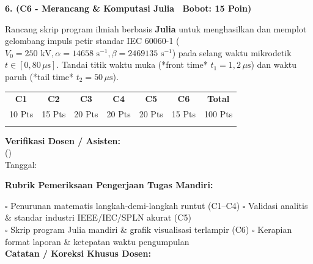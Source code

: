 \documentclass[10pt,a4paper]{article}
\begin{document}
\vspace{3.5mm}

\noindent\textbf{6. (C6 - Merancang \& Komputasi Julia \textbar\ Bobot: 15 Poin)}\par\vspace{0.8mm}
{\footnotesize Rancang skrip program ilmiah berbasis \textbf{Julia} untuk menghasilkan dan memplot gelombang impuls petir standar IEC 60060-1 ($V_0 = 250\text{ kV}, \alpha = 14658\text{ s}^{-1}, \beta = 2469135\text{ s}^{-1}$) pada selang waktu mikrodetik $t \in [0, 80\,\mu\text{s}]$. Tandai titik waktu muka (*front time* $t_1 = 1{,}2\,\mu\text{s}$) dan waktu paruh (*tail time* $t_2 = 50\,\mu\text{s}$).}\par

\vfill

\noindent\begin{minipage}[b]{0.62\textwidth}%
  \centering
  \scriptsize
  \begin{tabular}{|c|c|c|c|c|c|c|}
    \hline
    \rowcolor{unibblue}
    \textbf{\color{white}C1} & \textbf{\color{white}C2} & \textbf{\color{white}C3} & \textbf{\color{white}C4} & \textbf{\color{white}C5} & \textbf{\color{white}C6} & \textbf{\color{white}Total} \\
    \rowcolor{unibblue!10}
    10 Pts & 15 Pts & 20 Pts & 20 Pts & 20 Pts & 15 Pts & 100 Pts \\
    \hline
    & & & & & & \\[3mm]
    \hline
  \end{tabular}%
\end{minipage}%
\hfill%
\begin{minipage}[b]{0.35\textwidth}%
  \centering
  \scriptsize
  \textbf{Verifikasi Dosen / Asisten:}\\[6mm]
  (\dotfill)\\[1mm]
  \tiny Tanggal: \dotfill
\end{minipage}\par

\vspace{2mm}
\begin{tcolorbox}[colback=white,colframe=unibblue!40!black,colbacktitle=unibblue!10,coltitle=unibblue,boxrule=0.5pt,arc=2pt,left=5pt,right=5pt,top=3pt,bottom=3pt,title=\textbf{\tiny Catatan Evaluasi \& Umpan Balik Dosen Pengampu}]
  \tiny
  \textbf{Rubrik Pemeriksaan Pengerjaan Tugas Mandiri:}\par\vspace{0.8mm}
  $\square$ Penurunan matematis langkah-demi-langkah runtut (C1--C4) \hfill $\square$ Validasi analitis \& standar industri IEEE/IEC/SPLN akurat (C5)\\[0.8mm]
  $\square$ Skrip program Julia mandiri \& grafik visualisasi terlampir (C6) \hfill $\square$ Kerapian format laporan \& ketepatan waktu pengumpulan\\[2.0mm]
  \textbf{Catatan / Koreksi Khusus Dosen:}\\[1.6cm]
\end{tcolorbox}
\end{document}
